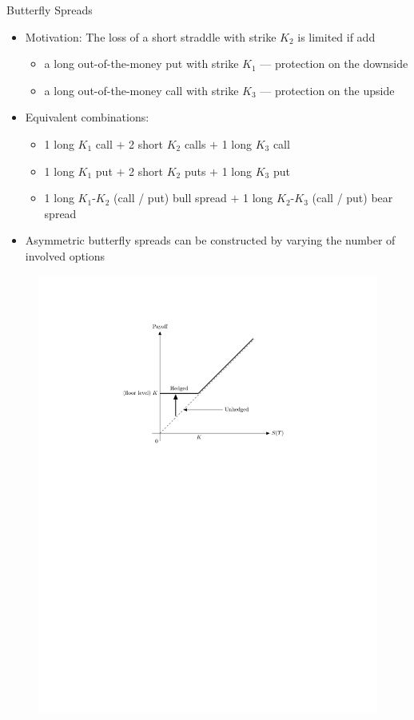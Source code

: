 \documentclass[10pt,handout]{beamer}
\theoremstyle{definition}
\begin{document}
\begin{frame}{Butterfly Spreads}
  \begin{itemize}
    \item Motivation: The loss of a short straddle with strike $K_2$ is limited if add
      \begin{itemize}
        \item a long out-of-the-money put with strike $K_1$ --- protection on the downside
        \item a long out-of-the-money call with strike $K_3$ --- protection on the upside
      \end{itemize}
    \item Equivalent combinations: 
      \begin{itemize}
        \item 1 long $K_1$ call $+$ 2 short $K_2$ calls $+$ 1 long $K_3$ call 
        \item 1 long $K_1$ put $+$ 2 short $K_2$ puts $+$ 1 long $K_3$ put
        \item 1 long $K_1$-$K_2$ (call / put) bull spread $+$ 1 long $K_2$-$K_3$ (call / put) bear spread
      \end{itemize}
    \item Asymmetric butterfly spreads can be constructed by varying the number of involved options
  \end{itemize}
  \begin{figure}[!htbp]
    \centering
    \includegraphics[scale=0.58,page=16]{fig/note08/lo.pdf}

\end{figure}
\end{frame}
\end{document}
